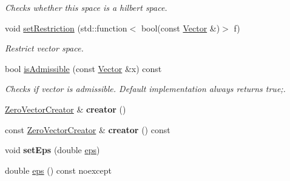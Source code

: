 \begin{DoxyCompactItemize}
\begin{DoxyCompactList}\small\item\em Checks whether this space is a hilbert space. \end{DoxyCompactList}\item 
void \hyperlink{classSpacy_1_1VectorSpace_a7c5f4a8c5937f9e07592483666b20ef7}{set\+Restriction} (std\+::function$<$ bool(const \hyperlink{classSpacy_1_1Vector}{Vector} \&)$>$ f)
\begin{DoxyCompactList}\small\item\em Restrict vector space. \end{DoxyCompactList}\item 
bool \hyperlink{classSpacy_1_1VectorSpace_a4beac78b082a364eb97e938b6c4928d2}{is\+Admissible} (const \hyperlink{classSpacy_1_1Vector}{Vector} \&x) const \hypertarget{classSpacy_1_1VectorSpace_a4beac78b082a364eb97e938b6c4928d2}{}\label{classSpacy_1_1VectorSpace_a4beac78b082a364eb97e938b6c4928d2}

\begin{DoxyCompactList}\small\item\em Checks if vector is admissible. Default implementation always returns true;. \end{DoxyCompactList}\item 
\hyperlink{classSpacy_1_1ZeroVectorCreator}{Zero\+Vector\+Creator} \& {\bfseries creator} ()\hypertarget{classSpacy_1_1VectorSpace_a254d66fbb07d0abfaa583aba520d3dc3}{}\label{classSpacy_1_1VectorSpace_a254d66fbb07d0abfaa583aba520d3dc3}

\item 
const \hyperlink{classSpacy_1_1ZeroVectorCreator}{Zero\+Vector\+Creator} \& {\bfseries creator} () const \hypertarget{classSpacy_1_1VectorSpace_acc3d5b5210cc810d8011e8a4308150e7}{}\label{classSpacy_1_1VectorSpace_acc3d5b5210cc810d8011e8a4308150e7}

\item 
void {\bfseries set\+Eps} (double \hyperlink{classSpacy_1_1Mixin_1_1Eps_a40e2ba8f3abd2b5370ef41238cfaaf8b}{eps})\hypertarget{classSpacy_1_1Mixin_1_1Eps_a1bbfd62541610d5d80f2782ab77158e4}{}\label{classSpacy_1_1Mixin_1_1Eps_a1bbfd62541610d5d80f2782ab77158e4}

\item 
double \hyperlink{classSpacy_1_1Mixin_1_1Eps_a40e2ba8f3abd2b5370ef41238cfaaf8b}{eps} () const noexcept\hypertarget{classSpacy_1_1Mixin_1_1Eps_a40e2ba8f3abd2b5370ef41238cfaaf8b}{}\label{classSpacy_1_1Mixin_1_1Eps_a40e2ba8f3abd2b5370ef41238cfaaf8b}


\end{DoxyCompactItemize}
